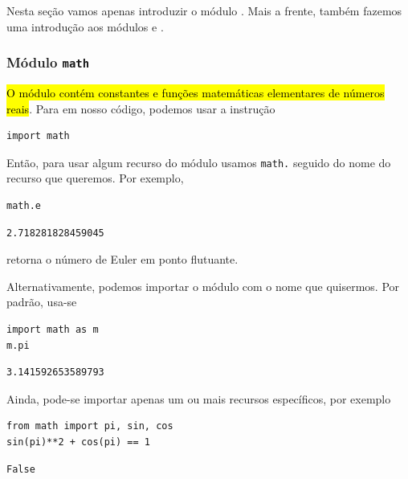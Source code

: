 Nesta seção vamos apenas introduzir o módulo {\PYTHONmath}. Mais a frente, também fazemos uma introdução aos módulos {\PYTHONnumpy} e {\PYTHONmatplotlib}.

\subsubsection{Módulo \texttt{math}}

\hl{O módulo {\PYTHONmath} contém constantes e funções matemáticas elementares de números reais}. Para  em nosso código, podemos usar a instrução \hl{{\PYTHONimport}}

\begin{lstlisting}
import math
\end{lstlisting}

Então, para usar algum recurso do módulo usamos \texttt{math.} seguido do nome do recurso que queremos. Por exemplo,

\begin{lstlisting}
math.e
\end{lstlisting}

\begin{verbatim}
2.718281828459045
\end{verbatim}

retorna o número de Euler{\euler} em ponto flutuante.

Alternativamente, podemos importar o módulo com o nome que quisermos. Por padrão, usa-se

\begin{lstlisting}
import math as m
m.pi
\end{lstlisting}

\begin{verbatim}
3.141592653589793
\end{verbatim}

Ainda, pode-se importar apenas um ou mais recursos específicos, por exemplo

\begin{lstlisting}
from math import pi, sin, cos
sin(pi)**2 + cos(pi) == 1
\end{lstlisting}

\begin{verbatim}
False
\end{verbatim}

